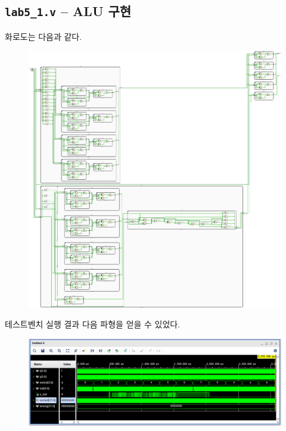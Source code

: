 \documentclass{scrartcl}
\begin{document}
\subsection{\texttt{lab5\_1.v} -- ALU 구현}
화로도는 다음과 같다.
\begin{figure}[H]
  \centering
  \includegraphics[width=0.9\linewidth]{lab5_1_schematic_expanded-crop.pdf}
\end{figure}
테스트벤치 실행 결과 다음 파형을 얻을 수 있었다.
\begin{figure}[H]
  \centering
  \includegraphics[width=0.9\linewidth]{lab5_1_waveform.png}
\end{figure}
\end{document}
